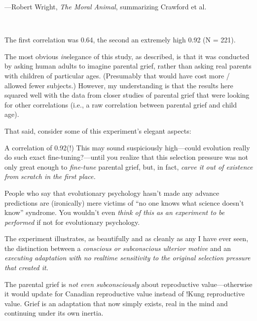 {\raggedleft
 {}---Robert Wright, \textit{The Moral Animal},\newline
 summarizing Crawford et al.
\par}


\bigskip

{
 ~}

{
 The first correlation was 0.64, the second an extremely high 0.92
(N = 221).}

{
 The most obvious \textit{in}elegance of this study, as described,
is that it was conducted by asking human adults to imagine parental
grief, rather than asking real parents with children of particular
ages. (Presumably that would have cost more / allowed fewer subjects.)
However, my understanding is that the results here squared well with
the data from closer studies of parental grief that were looking for
other correlations (i.e., a raw correlation between parental grief and
child age).}

{
 That said, consider some of this experiment's
elegant aspects:}

{
 A correlation of 0.92(!) This may sound suspiciously high---could
evolution really do such exact fine-tuning?---until you realize that
this selection pressure was not only great enough to \textit{fine-tune}
parental grief, but, in fact, \textit{carve it out of existence from
scratch in the first place.}}

{
 People who say that evolutionary psychology hasn't
made any advance predictions are (ironically) mere victims of
``no one knows what science doesn't
know'' syndrome. You wouldn't even
\textit{think of this as an experiment to be performed} if not for
evolutionary psychology.}

{
 The experiment illustrates, as beautifully and as cleanly as any I
have ever seen, the distinction between a \textit{conscious or
subconscious ulterior motive} and an \textit{executing adaptation with
no realtime sensitivity to the original selection pressure that created
it.}}

{
 The parental grief is \textit{not even subconsciously} about
reproductive value---otherwise it would update for Canadian
reproductive value instead of !Kung reproductive value. Grief is an
adaptation that now simply exists, real in the mind and continuing
under its own inertia.}

